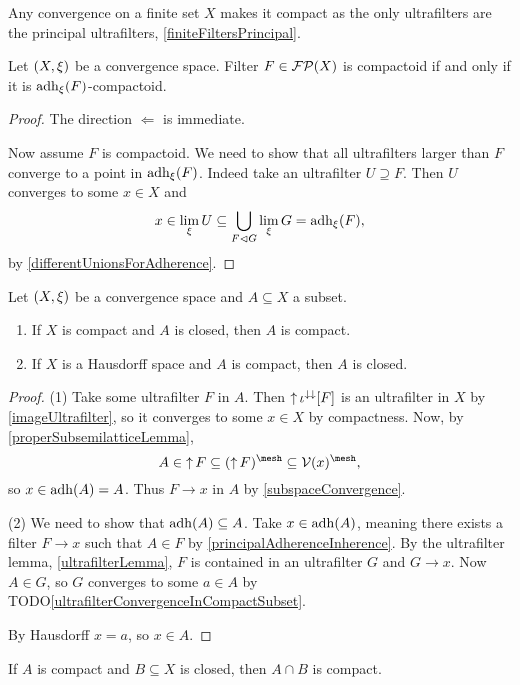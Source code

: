 \begin{example}
Any convergence on a finite set $X$ makes it compact as the only ultrafilters are the principal ultrafilters, \ref{finiteFiltersPrincipal}.
\end{example}

\begin{lemma}
Let $\left( X,\xi \right)$ be a convergence space. Filter $F\in\operatorname{\mathcal{FP}}(X)$ is compactoid \textup{if and only if} it is $\operatorname{adh}_\xi(F)$-compactoid.
\end{lemma}
\begin{proof}
The direction $\Leftarrow$ is immediate.

Now assume $F$ is compactoid. We need to show that all ultrafilters larger than $F$ converge to a point in $\operatorname{adh}_\xi(F)$. Indeed take an ultrafilter $U\supseteq F$. Then $U$ converges to some $x\in X$ and
\[ x\in \lim_\xi U \subseteq \bigcup_{F\lhd G}\lim_\xi G = \operatorname{adh}_\xi(F), \]
by \ref{differentUnionsForAdherence}.
\end{proof}

\begin{proposition} \label{compactClosedSets}
Let $\left( X,\xi \right)$ be a convergence space and $A\subseteq X$ a subset.
\begin{enumerate}
\item If $X$ is compact and $A$ is closed, then $A$ is compact.
\item If $X$ is a Hausdorff space and $A$ is compact, then $A$ is closed.
\end{enumerate}
\end{proposition}
\begin{proof}
(1) Take some ultrafilter $F$ in $A$. Then $\operatorname{\uparrow} \iota^{\downarrow\downarrow}[F]$ is an ultrafilter in $X$ by \ref{imageUltrafilter}, so it converges to some $x\in X$ by compactness. Now, by \ref{properSubsemilatticeLemma},
\[ A \in \upset F \subseteq (\upset F)^{\mesh} \subseteq \vicinity(x)^{\mesh}, \]
so $x\in \operatorname{adh}(A) = A$. Thus $F \to x$ in $A$ by \ref{subspaceConvergence}.

(2) We need to show that $\operatorname{adh}(A)\subseteq A$. Take $x\in \operatorname{adh}(A)$, meaning there exists a filter $F\to x$ such that $A\in F$ by \ref{principalAdherenceInherence}. By the ultrafilter lemma, \ref{ultrafilterLemma}, $F$ is contained in an ultrafilter $G$ and $G\to x$. Now $A\in G$, so $G$ converges to some $a\in A$ by TODO\ref{ultrafilterConvergenceInCompactSubset}.

By Hausdorff $x = a$, so $x\in A$.
\end{proof}
\begin{corollary}
If $A$ is compact and $B\subseteq X$ is closed, then $A\cap B$ is compact.
\end{corollary}

